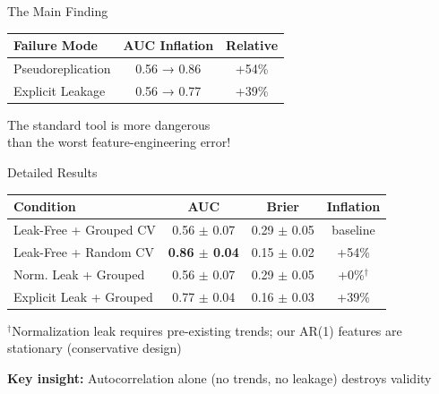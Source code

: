 \documentclass[aspectratio=169]{beamer}
\begin{document}
\begin{frame}{The Main Finding}
\begin{center}
\LARGE{}

\vspace{2em}
\begin{tabular}{lcc}
\toprule
\textbf{Failure Mode} & \textbf{AUC Inflation} & \textbf{Relative} \\
\midrule
\alert{Pseudoreplication} & 0.56 → 0.86 & \alert{+54\%} \\
Explicit Leakage & 0.56 → 0.77 & +39\% \\
\bottomrule
\end{tabular}

\vspace{2em}
\Large
\alert{The standard tool is more dangerous}\\
\alert{than the worst feature-engineering error!}
\end{center}
\end{frame}

\begin{frame}{Detailed Results}
\begin{table}
\centering
\small
\begin{tabular}{lccc}
\toprule
\textbf{Condition} & \textbf{AUC} & \textbf{Brier} & \textbf{Inflation} \\
\midrule
Leak-Free + Grouped CV & 0.56 $\pm$ 0.07 & 0.29 $\pm$ 0.05 & baseline \\
\rowcolor{red!10}
Leak-Free + Random CV & \textbf{0.86 $\pm$ 0.04} & 0.15 $\pm$ 0.02 & \alert{+54\%} \\
Norm. Leak + Grouped & 0.56 $\pm$ 0.07 & 0.29 $\pm$ 0.05 & +0\%$^\dagger$ \\
Explicit Leak + Grouped & 0.77 $\pm$ 0.04 & 0.16 $\pm$ 0.03 & +39\% \\
\bottomrule
\end{tabular}
\end{table}

\vspace{0.5em}
\footnotesize
$^\dagger$Normalization leak requires pre-existing trends; our AR(1) features are stationary (conservative design)

\vspace{1em}
\textbf{Key insight:} Autocorrelation alone (no trends, no leakage) destroys validity
\end{frame}
\end{document}
